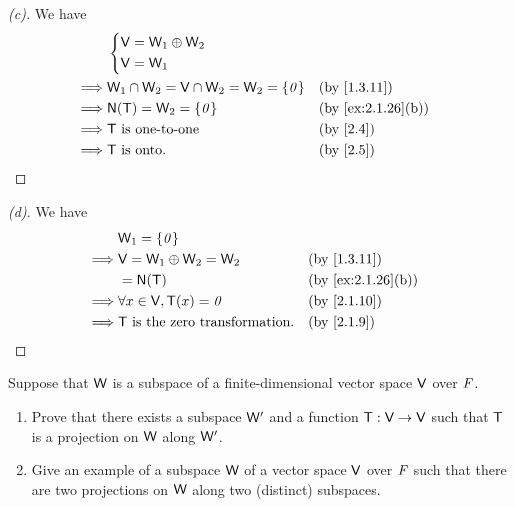 \begin{proof}[(c)]
	We have
	\begin{align*}
		         & \begin{dcases}
			           \V = \W_1 \oplus \W_2 \\
			           \V = \W_1
		           \end{dcases}                                                   \\
		\implies & \W_1 \cap \W_2 = \V \cap \W_2 = \W_2 = \set{\zv} &  & \by{1.3.11}       \\
		\implies & \ns{\T} = \W_2 = \set{\zv}                       &  & \by{ex:2.1.26}[b] \\
		\implies & \T \text{ is one-to-one}                         &  & \by{2.4}          \\
		\implies & \T \text{ is onto}.                              &  & \by{2.5}
	\end{align*}
\end{proof}

\begin{proof}[(d)]
	We have
	\begin{align*}
		         & \W_1 = \set{\zv}                                              \\
		\implies & \V = \W_1 \oplus \W_2 = \W_2           &  & \by{1.3.11}       \\
		         & = \ns{\T}                              &  & \by{ex:2.1.26}[b] \\
		\implies & \forall x \in \V, \T(x) = \zv          &  & \by{2.1.10}       \\
		\implies & \T \text{ is the zero transformation}. &  & \by{2.1.9}
	\end{align*}
\end{proof}

\begin{ex}\label{ex:2.1.27}
	Suppose that \(\mathsf{W}\) is a subspace of a finite-dimensional vector space \(\mathsf{V}\) over \(\mathit{F}\).
	\begin{enumerate}
		\item Prove that there exists a subspace \(\mathsf{W}'\) and a function \(\mathsf{T} : \mathsf{V} \to \mathsf{V}\) such that \(\mathsf{T}\) is a projection on \(\mathsf{W}\) along \(\mathsf{W}'\).
		\item Give an example of a subspace \(\mathsf{W}\) of a vector space \(\mathsf{V}\) over \(\mathit{F}\) such that there are two projections on \(\mathsf{W}\) along two (distinct) subspaces.
	\end{enumerate}
\end{ex}

